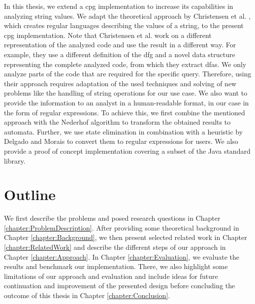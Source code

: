 In this thesis, we extend a \acf{cpg} implementation \cite{cpg} to increase its capabilities in analyzing string values. We adapt the theoretical approach by Christensen et al. \cite{brics}, which creates regular languages describing the values of a string, to the present \ac{cpg} implementation. Note that Christensen et al. work on a different representation of the analyzed code and use the result in a different way. For example, they use a different definition of the \ac{dfg} and a novel data structure representing the complete analyzed code, from which they extract \acp{dfa}. We only analyze parts of the code that are required for the specific query. Therefore, using their approach requires adaptation of the used techniques and solving of new problems like the handling of string operations for our use case. We also want to provide the information to an analyst in a human-readable format, in our case in the form of regular expressions.
To achieve this, we first combine the mentioned approach with the Nederhof algorithm \cite{nederhof} to transform the obtained results to automata. Further, we use state elimination in combination with a heuristic by Delgado and Morais \cite{delgado} to convert them to regular expressions for users. We also provide a proof of concept implementation covering a subset of the Java standard library.

\section{Outline}\label{sec:intro:outline}

We first describe the problems and posed research questions in Chapter \ref{chapter:ProblemDescription}.
After providing some theoretical background in Chapter \ref{chapter:Background}, we then present selected related work in Chapter \ref{chapter:RelatedWork} and describe the different steps of our approach in Chapter \ref{chapter:Approach}.
In Chapter \ref{chapter:Evaluation}, we evaluate the results and benchmark our implementation. There, we also highlight some limitations of our approach and evaluation and include ideas for future continuation and improvement of the presented design before concluding the outcome of this thesis in Chapter \ref{chapter:Conclusion}.
